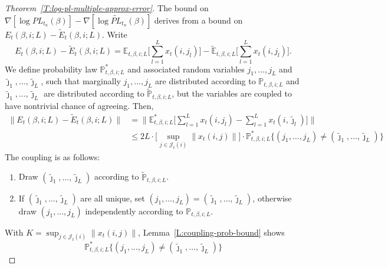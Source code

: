 \documentclass[final]{statsoc}
\begin{document}
\begin{proof}[Theorem~\ref{T:log-pl-multiple-approx-error}]
The bound on
\(
    \nabla [\log \mathit{PL}_{t_n}(\beta) ]
    -
    \nabla [\log \widetilde{\mathit{PL}}_{t_n}(\beta) ]
\)
derives from a bound on
\(
    E_t(\beta,i;L)
    -
    \widetilde E_t(\beta,i;L).
\)
Write
\[
    E_{t}(\beta, i; L) - \widetilde{E}_t(\beta, i; L)
        =
        \mathbb{E}_{t,\beta,i;L}
            \Big[ \sum_{l=1}^L x_t(i,j_l) \Big]
        -
        \widetilde{\mathbb{E}}_{t,\beta,i;L}
            \Big[ \sum_{l=1}^L x_t(i,j_l) \Big].
\]
We define probability law $\mathbb{P}^\ast_{t,\beta,i;L}$ and
associated random variables $j_1, \ldots, j_L$ and
$\tilde \jmath_1, \ldots, \tilde \jmath_L$, such that marginally
$j_1, \ldots, j_L$ are distributed according to $\mathbb{P}_{t,\beta,i;L}$
and $\tilde \jmath_1, \ldots, \tilde \jmath_L$ are distributed according
to $\tilde{\mathbb{P}}_{t,\beta,i;L}$, but the variables are coupled to have
nontrivial chance of agreeing.  Then,
\begin{align*}
    \Big\| E_{t}(\beta, i; L) - \widetilde{E}_t(\beta, i; L) \Big\|
        &=
            \Big\|
            \mathbb{E}_{t,\beta,i;L}^\ast
            \Big[
                \sum_{l=1}^L x_t(i,j_l)
                -
                \sum_{l=1}^L x_t(i, \tilde \jmath_l)
            \Big]
            \Big\| \\
        &\leq
            2 L
            \cdot
            \Big[
                \sup_{j \in \mathcal{J}_t(i)}
                \| x_t(i,j) \|
            \Big]
            \cdot
            \mathbb{P}^\ast_{t,\beta,i;L}
            \Big\{
                (j_1, \ldots, j_L)
                    \neq
                    (\tilde \jmath_1, \ldots, \tilde \jmath_L)
            \Big\}
\end{align*}
The coupling is as follows:
\begin{enumerate}
    \item Draw $(\tilde \jmath_1, \ldots, \tilde \jmath_L)$ according to
        $\tilde{\mathbb{P}}_{t,\beta,i;L}$.
    \item If $(\tilde \jmath_1, \ldots, \tilde \jmath_L)$ are all unique,
        set $(j_1, \ldots, j_L) = (\tilde \jmath_1, \ldots, \tilde \jmath_L)$,
        otherwise draw $(j_1, \ldots, j_L)$ independently according to
        $\mathbb{P}_{t,\beta,i;L}$.
\end{enumerate}
With $K = \sup_{j \in \mathcal{J}_t(i)} \| x_t(i,j) \|$,
Lemma~\ref{L:coupling-prob-bound} shows
\[
    \mathbb{P}^\ast_{t,\beta,i;L}
    \Big\{
        (j_1, \ldots, j_L)
            \neq
            (\tilde \jmath_1, \ldots, \tilde \jmath_L)
    \Big\}
\]
\end{proof}
\end{document}

